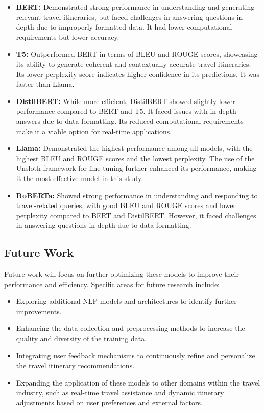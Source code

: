 \documentclass[conference]{IEEEtran}
\begin{document}
        \begin{itemize}
            \item \textbf{BERT:} Demonstrated strong performance in understanding and generating relevant travel itineraries, but faced challenges in answering questions in depth due to improperly formatted data. It had lower computational requirements but lower accuracy.
            \item \textbf{T5:} Outperformed BERT in terms of BLEU and ROUGE scores, showcasing its ability to generate coherent and contextually accurate travel itineraries. Its lower perplexity score indicates higher confidence in its predictions. It was faster than Llama.
            \item \textbf{DistilBERT:} While more efficient, DistilBERT showed slightly lower performance compared to BERT and T5. It faced issues with in-depth answers due to data formatting. Its reduced computational requirements make it a viable option for real-time applications.
            \item \textbf{Llama:} Demonstrated the highest performance among all models, with the highest BLEU and ROUGE scores and the lowest perplexity. The use of the Unsloth framework for fine-tuning further enhanced its performance, making it the most effective model in this study.
            \item \textbf{RoBERTa:} Showed strong performance in understanding and responding to travel-related queries, with good BLEU and ROUGE scores and lower perplexity compared to BERT and DistilBERT. However, it faced challenges in answering questions in depth due to data formatting.
        \end{itemize}

    \subsection{Future Work}

        Future work will focus on further optimizing these models to improve their performance and efficiency. Specific areas for future research include:
        \begin{itemize}
            \item Exploring additional NLP models and architectures to identify further improvements.
            \item Enhancing the data collection and preprocessing methods to increase the quality and diversity of the training data.
            \item Integrating user feedback mechanisms to continuously refine and personalize the travel itinerary recommendations.
            \item Expanding the application of these models to other domains within the travel industry, such as real-time travel assistance and dynamic itinerary adjustments based on user preferences and external factors.
        \end{itemize}
\end{document}
